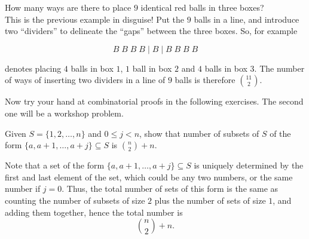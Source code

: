 \documentclass[11pt,dvipsnames]{book}
\numberwithin{figure}{section} %
\numberwithin{table}{section} %
\begin{document}
\begin{example}\label{identicalballsinboxes}
How many ways are there to place $9$ identical red balls in three boxes? \\

This is the previous example in disguise! Put the
$9$ balls in a line, and introduce two ``dividers''
to delineate the ``gaps'' between the three boxes.
So, for example

$$ B\;B\;B\;B\; |\; B\; |\; B\; B\;B\;B$$

\noindent
denotes placing $4$ balls in box $1$, $1$ ball in box $2$ and $4$ balls in box 3. The number of ways of inserting two dividers in a line of $9$ balls is therefore ${11\choose 2}$.

\end{example}
%
%
%
%
%

Now try your hand at combinatorial proofs in the following exercises. The second one will be a workshop problem.

\begin{exercise}
Given $S=\{1,2, \dots ,n\}$ and $0\leq j<n$, show that number of subsets of $S$ of the form $\{a,a+1, \dots ,a+j\}\subseteq S$ is ${n\choose 2} + n$.
\begin{solution}
Note that a set of the form $\{a,a+1, \dots ,a+j\}\subseteq S$ is uniquely determined by the first and last element of the set, which could be any two numbers, or the same number if $j=0$. Thus, the total number of sets of this form is the same as counting the number of subsets of size $2$ plus the number of sets of size $1$, and adding them together, hence the total number is
\[
{n\choose 2} + n.
\]
\end{solution}
\end{exercise}
\end{document}
